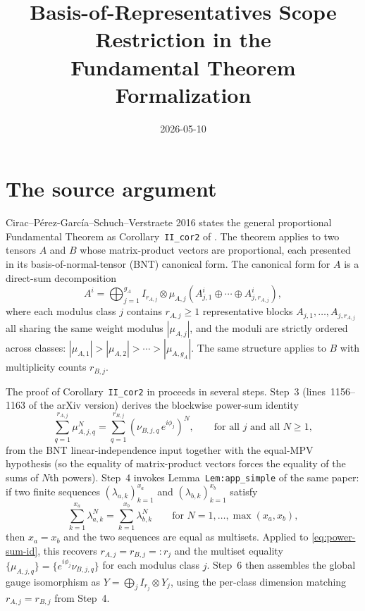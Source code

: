 \documentclass{article}
\title{Basis-of-Representatives Scope Restriction in the\\Fundamental Theorem Formalization}
\author{}
\date{2026-05-10}
\begin{document}
\maketitle

\section{The source argument}

Cirac--P\'erez-Garc\'ia--Schuch--Verstraete 2016 states the general
proportional Fundamental Theorem as Corollary~\texttt{II\_cor2} of
\cite{Cirac2016MPDO_arXiv}. The theorem applies to two tensors $A$ and $B$
whose matrix-product vectors are proportional, each presented in its
basis-of-normal-tensor (BNT) canonical form. The canonical form for $A$ is a
direct-sum decomposition
\[
    A^i = \bigoplus_{j=1}^{g_A} I_{r_{A,j}} \otimes \mu_{A,j} (A_{j,1}^i \oplus \cdots \oplus A_{j,r_{A,j}}^i),
\]
where each modulus class $j$ contains $r_{A,j} \ge 1$ representative blocks
$A_{j,1},\ldots,A_{j,r_{A,j}}$ all sharing the same weight modulus
$|\mu_{A,j}|$, and the moduli are strictly ordered across classes:
$|\mu_{A,1}| > |\mu_{A,2}| > \cdots > |\mu_{A,g_A}|$. The same structure
applies to $B$ with multiplicity counts $r_{B,j}$.

The proof of Corollary~\texttt{II\_cor2} in \cite{Cirac2016MPDO_arXiv}
proceeds in several steps. Step~3 (lines~1156--1163 of the arXiv version)
derives the blockwise power-sum identity
\begin{equation}
    \sum_{q=1}^{r_{A,j}} \mu_{A,j,q}^N
    = \sum_{q=1}^{r_{B,j}} (\nu_{B,j,q}\,e^{i\phi_j})^N,
    \qquad \text{for all } j \text{ and all } N \ge 1,
    \label{eq:power-sum-id}
\end{equation}
from the BNT linear-independence input together with the equal-MPV hypothesis
(so the equality of matrix-product vectors forces the equality of the sums of
$N$th powers). Step~4 invokes Lemma~\texttt{Lem:app\_simple} of the same
paper: if two finite sequences $(\lambda_{a,k})_{k=1}^{x_a}$ and
$(\lambda_{b,k})_{k=1}^{x_b}$ satisfy
\[
    \sum_{k=1}^{x_a} \lambda_{a,k}^N = \sum_{k=1}^{x_b} \lambda_{b,k}^N
    \qquad \text{for } N = 1, \ldots, \max(x_a, x_b),
\]
then $x_a = x_b$ and the two sequences are equal as multisets. Applied to
\eqref{eq:power-sum-id}, this recovers $r_{A,j} = r_{B,j} =: r_j$ and the
multiset equality $\{\mu_{A,j,q}\} = \{e^{i\phi_j}\nu_{B,j,q}\}$ for each
modulus class $j$. Step~6 then assembles the global gauge isomorphism as
$Y = \bigoplus_j I_{r_j} \otimes Y_j$, using the per-class dimension matching
$r_{A,j} = r_{B,j}$ from Step~4.
\end{document}
